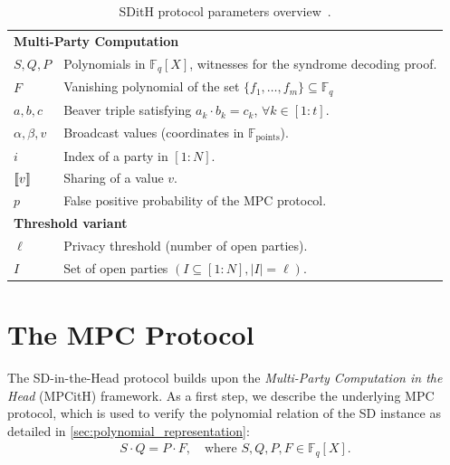 \documentclass[11pt]{report}
\theoremstyle{definition}
\theoremstyle{plain}
\begin{document}
\begin{table}[]
\begin{tabular}{p{}p{}}
    \multicolumn{2}{l}{\textbf{Multi-Party Computation}}                                                                                  \\
    $S, Q, P$                    & Polynomials in $\mathbb{F}_q[X]$, witnesses for the syndrome decoding proof.                           \\
    $F$                          & Vanishing polynomial of the set $\{f_1, \ldots, f_m\} \subseteq \mathbb{F}_q$                          \\
    $a, b, c$                    & Beaver triple satisfying $a_k \cdot b_k = c_k$, $\forall k \in [1 : t]$.                               \\
    $\alpha, \beta, v$           & Broadcast values (coordinates in $\mathbb{F}_{\text{points}}$).                                        \\
    $i$                          & Index of a party in $[1 : N]$.                                                                         \\
    $\llbracket v \rrbracket$                     & Sharing of a value $v$.                                                                                \\
    $p$                          & False positive probability of the MPC protocol.                                                        \\ \hline

    \multicolumn{2}{l}{\textbf{Threshold variant}}                                                                                        \\
    $\ell$                       & Privacy threshold (number of open parties).                                                            \\
    $I$                          & Set of open parties $(I \subseteq [1 : N], |I| = \ell)$.                                               \\
  \end{tabular}
  \caption{SDitH protocol parameters overview~\cite[Table 1]{aguilarsyndrome11}.}\label{tab:sdith-protocol-parameters}
\end{table}

\section{The MPC Protocol}

The SD-in-the-Head protocol builds upon the \textit{Multi-Party Computation in the Head} (MPCitH) framework. As a first step, we describe the underlying MPC protocol, which is used to verify the polynomial relation of the SD instance as detailed in \autoref{sec:polynomial_representation}:
\begin{align*}
  S \cdot Q = P \cdot F, \quad \text{where } S, Q, P, F \in \mathbb{F}_q[X].
\end{align*}
\end{document}
